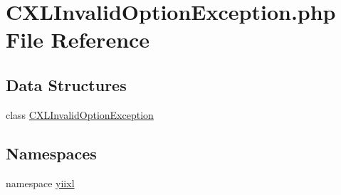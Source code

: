 \hypertarget{CXLInvalidOptionException_8php}{
\section{CXLInvalidOptionException.php File Reference}
\label{CXLInvalidOptionException_8php}
}
\subsection*{Data Structures}
\begin{DoxyCompactItemize}
\item 
class \hyperlink{classCXLInvalidOptionException}{CXLInvalidOptionException}
\end{DoxyCompactItemize}
\subsection*{Namespaces}
\begin{DoxyCompactItemize}
\item 
namespace \hyperlink{namespaceyiixl}{yiixl}
\end{DoxyCompactItemize}
